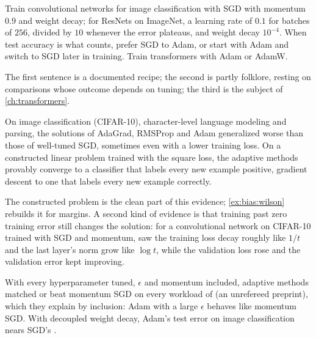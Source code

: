 \begin{refsection}
\begin{practice}
Train convolutional networks for image classification with SGD with momentum $0.9$ and weight decay; for ResNets on ImageNet, a learning rate of $0.1$ for batches of $256$, divided by $10$ whenever the error plateaus, and weight decay $10^{-4}$. When test accuracy is what counts, prefer SGD to Adam, or start with Adam and switch to SGD later in training. Train transformers with Adam or AdamW.
\end{practice}

The first sentence is a documented recipe; the second is partly folklore, resting on comparisons whose outcome depends on tuning; the third is the subject of \cref{ch:transformers}.

\begin{observation}\label{obs:bias:wilson}
On image classification (CIFAR-10), character-level language modeling and parsing, the solutions of AdaGrad, RMSProp and Adam generalized worse than those of well-tuned SGD, sometimes even with a lower training loss. On a constructed linear problem trained with the square loss, the adaptive methods provably converge to a classifier that labels every new example positive, gradient descent to one that labels every new example correctly.
\end{observation}

The constructed problem is the clean part of this evidence; \cref{ex:bias:wilson} rebuilds it for margins. A second kind of evidence is that training past zero training error still changes the solution: for a convolutional network on CIFAR-10 trained with SGD and momentum, \textcite{SoudryEtAl2018} saw the training loss decay roughly like $1/t$ and the last layer's norm grow like $\log t$, while the validation loss rose and the validation error kept improving.

\begin{observation}\label{obs:bias:tuning}
With every hyperparameter tuned, $\epsilon$ and momentum included, adaptive methods matched or beat momentum SGD on every workload of \textcite{ChoiEtAl2019} (an unrefereed preprint), which they explain by inclusion: Adam with a large $\epsilon$ behaves like momentum SGD. With decoupled weight decay, Adam's test error on image classification nears SGD's \parencite{LoshchilovHutter2019}.
\end{observation}


\end{refsection}
